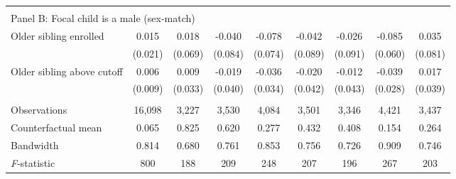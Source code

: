 {{\begin{tabular}{lcccccccc}
&  &  &  & & & & & \\
\multicolumn{10}{l}{Panel B: Focal child is a male (sex-match)} \\
Older sibling enrolled&       0.015   &       0.018   &      -0.040   &      -0.078   &      -0.042   &      -0.026   &      -0.085   &       0.035   \\
                    &     (0.021)   &     (0.069)   &     (0.084)   &     (0.074)   &     (0.089)   &     (0.091)   &     (0.060)   &     (0.081)   \\
 
Older sibling above cutoff&       0.006   &       0.009   &      -0.019   &      -0.036   &      -0.020   &      -0.012   &      -0.039   &       0.017   \\
                    &     (0.009)   &     (0.033)   &     (0.040)   &     (0.034)   &     (0.042)   &     (0.043)   &     (0.028)   &     (0.039)   \\
                    &               &               &               &               &               &               &               &               \\
Observations        &      16,098   &       3,227   &       3,530   &       4,084   &       3,501   &       3,346   &       4,421   &       3,437   \\
Counterfactual mean &       0.065   &       0.825   &       0.620   &       0.277   &       0.432   &       0.408   &       0.154   &       0.264   \\
Bandwidth           &       0.814   &       0.680   &       0.761   &       0.853   &       0.756   &       0.726   &       0.909   &       0.746   \\
\textit{F}-statistic&         800   &         188   &         209   &         248   &         207   &         196   &         267   &         203   \\
 

\bottomrule
\end{tabular}
}
}
